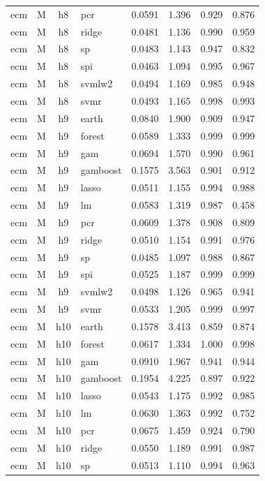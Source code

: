 \begin{ThreePartTable}
\begin{longtable}[t]{llclcccc}
ecm & M & h8 & pcr & 0.0591 & 1.396 & 0.929 & 0.876\\
ecm & M & h8 & ridge & 0.0481 & 1.136 & 0.990 & 0.959\\
ecm & M & h8 & sp & 0.0483 & 1.143 & 0.947 & 0.832\\
ecm & M & h8 & spi & 0.0463 & 1.094 & 0.995 & 0.967\\
ecm & M & h8 & svmlw2 & 0.0494 & 1.169 & 0.985 & 0.948\\
ecm & M & h8 & svmr & 0.0493 & 1.165 & 0.998 & 0.993\\
\addlinespace
ecm & M & h9 & earth & 0.0840 & 1.900 & 0.909 & 0.947\\
ecm & M & h9 & forest & 0.0589 & 1.333 & 0.999 & 0.999\\
ecm & M & h9 & gam & 0.0694 & 1.570 & 0.990 & 0.961\\
ecm & M & h9 & gamboost & 0.1575 & 3.563 & 0.901 & 0.912\\
ecm & M & h9 & lasso & 0.0511 & 1.155 & 0.994 & 0.988\\
ecm & M & h9 & lm & 0.0583 & 1.319 & 0.987 & 0.458\\
ecm & M & h9 & pcr & 0.0609 & 1.378 & 0.908 & 0.809\\
ecm & M & h9 & ridge & 0.0510 & 1.154 & 0.991 & 0.976\\
ecm & M & h9 & sp & 0.0485 & 1.097 & 0.988 & 0.867\\
ecm & M & h9 & spi & 0.0525 & 1.187 & 0.999 & 0.999\\
ecm & M & h9 & svmlw2 & 0.0498 & 1.126 & 0.965 & 0.941\\
ecm & M & h9 & svmr & 0.0533 & 1.205 & 0.999 & 0.997\\
\addlinespace
ecm & M & h10 & earth & 0.1578 & 3.413 & 0.859 & 0.874\\
ecm & M & h10 & forest & 0.0617 & 1.334 & 1.000 & 0.998\\
ecm & M & h10 & gam & 0.0910 & 1.967 & 0.941 & 0.944\\
ecm & M & h10 & gamboost & 0.1954 & 4.225 & 0.897 & 0.922\\
ecm & M & h10 & lasso & 0.0543 & 1.175 & 0.992 & 0.985\\
ecm & M & h10 & lm & 0.0630 & 1.363 & 0.992 & 0.752\\
ecm & M & h10 & pcr & 0.0675 & 1.459 & 0.924 & 0.790\\
ecm & M & h10 & ridge & 0.0550 & 1.189 & 0.991 & 0.987\\
ecm & M & h10 & sp & 0.0513 & 1.110 & 0.994 & 0.963\\

\end{longtable}
\end{ThreePartTable}
